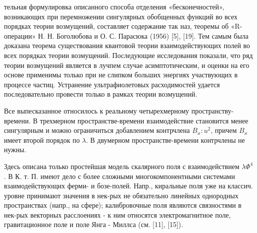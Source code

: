 \documentclass[10pt]{article}
\begin{document}
тельная формулировка описанного способа отделения «бесконечностей», возникающих при перемножении сингулярных обобщенных функций во всех порядках теории возмущений, составляет содержание так наз, теоремы об «R-операции» Н. Н. Боголюбова и О. С. Парасюка (1956) [5], [19]. Тем самым была доказана теорема существования квантовой теории взаимодействующих полей во всех порядках теории возмущений. Последующие исследования показали, что ряд теории возмущений является в лучпем случае асимптотическим, и оценки на его основе применимы только при не слипком больших энергиях участвующих в процессе частиц. Устранение ультрафиолетовых расходимостей удается последовательно провести только в рамках теории возмущений.



Все выпесказанное относилось к реальному четырехмерному пространству-времени. В трехмерном пространстве-времени взаимодействие становится менее сингулярным и можно ограничиться добавлением контрчлена $B_{\varkappa}: u^{2}$, причем $B_{\varkappa}$ имеет второй порядок по $\lambda$. В двумерном пространстве-времени контрчлены не нужны.



Здесь описана только простейшая модель скалярного поля с взаимодействием $\lambda \Phi^{4}$. В К. т. П. имеют дело с более сложными многокомпонентными системами взаимодействующих ферми- и бозе-полей. Напр., киральные поля уже на классич. уровне принимают значения в нек-рых не обязательно линейных однородных пространствах (напр., на сфере); калибровочные поля являются связностями в нек-рых векторных расслоениях - к ним относятся электромагнитное поле, гравитационное поле и поле Янга - Миллса (см. [11], [15]).
\end{document}

